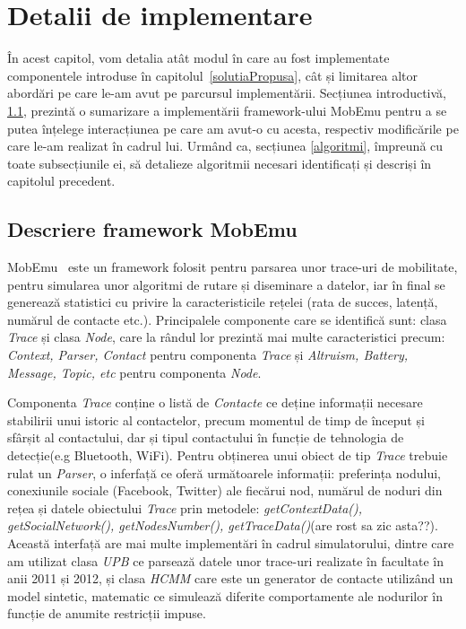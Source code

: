 \documentclass[12pt,a4paper]{report}
\begin{document}
\chapter{Detalii de implementare}	\label{detalii}

În acest capitol, vom detalia atât modul în care au fost implementate componentele introduse în capitolul~\ref{solutiaPropusa}, cât și limitarea altor abordări pe care le-am avut pe parcursul implementării. Secțiunea introductivă, \ref{introducere}, prezintă o sumarizare a implementării framework-ului MobEmu pentru a se putea înțelege interacțiunea pe care am avut-o cu acesta, respectiv modificările pe care le-am realizat în cadrul lui. 
Urmând ca, secțiunea \ref{algoritmi}, împreună cu toate subsecțiunile ei, să detalieze algoritmii necesari identificați și descriși în capitolul precedent.
 
\section{Descriere framework MobEmu} \label{introducere}
MobEmu~\cite{MobEmuArticle} este un framework folosit pentru parsarea unor trace-uri de mobilitate, pentru simularea unor algoritmi de rutare și diseminare a datelor, iar în final se generează statistici cu privire la caracteristicile rețelei (rata de succes, latență, numărul de contacte etc.). Principalele componente care se identifică sunt:  clasa \textit{Trace} și clasa \textit{Node}, care la rândul lor prezintă mai multe caracteristici precum: \textit{Context, Parser, Contact} pentru componenta \textit{Trace} și \textit{Altruism, Battery, Message, Topic, etc} pentru componenta \textit{Node}.

Componenta \textit{Trace} conține o listă de \textit{Contacte} ce deține informații necesare stabilirii unui istoric al contactelor, precum momentul de timp de început și sfârșit al contactului, dar și tipul contactului în funcție de tehnologia de detecție(e.g Bluetooth, WiFi). Pentru obținerea unui obiect de tip \textit{Trace} trebuie rulat un \textit{Parser}, o inferfață ce oferă următoarele informații: preferința nodului, conexiunile sociale (Facebook, Twitter) ale fiecărui nod, numărul de noduri din rețea și datele obiectului \textit{Trace} prin metodele: \textit{getContextData(), getSocialNetwork(), getNodesNumber(), getTraceData()}(are rost sa zic asta??). Această interfață are mai multe implementări în cadrul simulatorului, dintre care am utilizat clasa \textit{UPB} ce parsează datele unor trace-uri realizate în facultate în anii 2011 și 2012, și clasa \textit{HCMM} care este un generator de contacte utilizând un model sintetic, matematic ce simulează diferite comportamente ale nodurilor în funcție de anumite restricții impuse.
\end{document}
